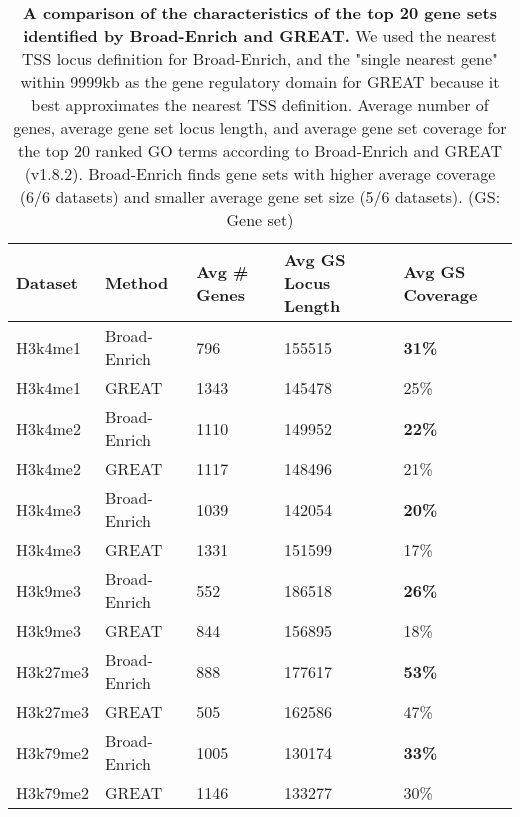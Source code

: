 \begin{table}[!ht]
\small
\centering
\begin{tabular}{ll|lll}
\textbf{Dataset} & \textbf{Method} & \textbf{Avg \# Genes} & \textbf{Avg GS Locus Length} & \textbf{Avg GS Coverage} \\\hline
H3k4me1          & Broad-Enrich    & 796                   & 155515                            & \textbf{31\%}                          \\
H3k4me1          & GREAT           & 1343                  & 145478                            & 25\%                          \\\hline
H3k4me2          & Broad-Enrich    & 1110                  & 149952                            & \textbf{22\%}                          \\
H3k4me2          & GREAT           & 1117                  & 148496                            & 21\%                          \\\hline
H3k4me3          & Broad-Enrich    & 1039                  & 142054                            & \textbf{20\%}                          \\
H3k4me3          & GREAT           & 1331                  & 151599                            & 17\%                          \\\hline
H3k9me3          & Broad-Enrich    & 552                   & 186518                            & \textbf{26\%}                          \\
H3k9me3          & GREAT           & 844                   & 156895                            & 18\%                          \\\hline
H3k27me3         & Broad-Enrich    & 888                   & 177617                            & \textbf{53\%}                          \\
H3k27me3         & GREAT           & 505                   & 162586                            & 47\%                          \\\hline
H3k79me2         & Broad-Enrich    & 1005                  & 130174                            & \textbf{33\%}                          \\
H3k79me2         & GREAT           & 1146                  & 133277                            & 30\%
\end{tabular}
\normalsize
\caption[A comparison of the characteristics of the top 20 gene sets identified by Broad-Enrich and GREAT.]
{
\textbf{A comparison of the characteristics of the top 20 gene sets identified by Broad-Enrich and GREAT.}
We used the nearest TSS locus definition for Broad-Enrich, and the "single nearest gene" within 9999kb as the gene regulatory domain for GREAT because it best approximates the nearest TSS definition. Average number of genes, average gene set locus length, and average gene set coverage for the top 20 ranked GO terms according to Broad-Enrich and GREAT (v1.8.2). Broad-Enrich finds gene sets with higher average coverage (6/6 datasets) and smaller average gene set size (5/6 datasets). (GS: Gene set)
}
\label{chap2:table:6}


\end{table}
